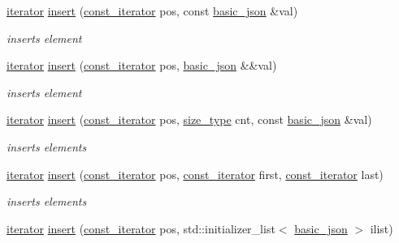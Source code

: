 \begin{DoxyCompactItemize}
\hyperlink{classnlohmann_1_1basic__json_ae3c77a8f03096da2a32a3de0c317d445}{iterator} \hyperlink{classnlohmann_1_1basic__json_a7f7bbb3a9efef2e2442f538a24c1c47b}{insert} (\hyperlink{classnlohmann_1_1basic__json_a2b53a089e945e75deaac6782aa942a77}{const\+\_\+iterator} pos, const \hyperlink{classnlohmann_1_1basic__json}{basic\+\_\+json} \&val)
\begin{DoxyCompactList}\small\item\em inserts element \end{DoxyCompactList}\item 
\hyperlink{classnlohmann_1_1basic__json_ae3c77a8f03096da2a32a3de0c317d445}{iterator} \hyperlink{classnlohmann_1_1basic__json_a8468efcfcd95db15f46887b29924ed5c}{insert} (\hyperlink{classnlohmann_1_1basic__json_a2b53a089e945e75deaac6782aa942a77}{const\+\_\+iterator} pos, \hyperlink{classnlohmann_1_1basic__json}{basic\+\_\+json} \&\&val)
\begin{DoxyCompactList}\small\item\em inserts element \end{DoxyCompactList}\item 
\hyperlink{classnlohmann_1_1basic__json_ae3c77a8f03096da2a32a3de0c317d445}{iterator} \hyperlink{classnlohmann_1_1basic__json_a624025acfcf64364d98424402b837bc6}{insert} (\hyperlink{classnlohmann_1_1basic__json_a2b53a089e945e75deaac6782aa942a77}{const\+\_\+iterator} pos, \hyperlink{classnlohmann_1_1basic__json_a1579a8f72a230358d6cd1a6e8a62859b}{size\+\_\+type} cnt, const \hyperlink{classnlohmann_1_1basic__json}{basic\+\_\+json} \&val)
\begin{DoxyCompactList}\small\item\em inserts elements \end{DoxyCompactList}\item 
\hyperlink{classnlohmann_1_1basic__json_ae3c77a8f03096da2a32a3de0c317d445}{iterator} \hyperlink{classnlohmann_1_1basic__json_aeaa0644fd6b99af364e772092268dfd6}{insert} (\hyperlink{classnlohmann_1_1basic__json_a2b53a089e945e75deaac6782aa942a77}{const\+\_\+iterator} pos, \hyperlink{classnlohmann_1_1basic__json_a2b53a089e945e75deaac6782aa942a77}{const\+\_\+iterator} first, \hyperlink{classnlohmann_1_1basic__json_a2b53a089e945e75deaac6782aa942a77}{const\+\_\+iterator} last)
\begin{DoxyCompactList}\small\item\em inserts elements \end{DoxyCompactList}\item 
\hyperlink{classnlohmann_1_1basic__json_ae3c77a8f03096da2a32a3de0c317d445}{iterator} \hyperlink{classnlohmann_1_1basic__json_aadb4e5be88221e5e28cdb752332f3d13}{insert} (\hyperlink{classnlohmann_1_1basic__json_a2b53a089e945e75deaac6782aa942a77}{const\+\_\+iterator} pos, std\+::initializer\+\_\+list$<$ \hyperlink{classnlohmann_1_1basic__json}{basic\+\_\+json} $>$ ilist)

\end{DoxyCompactItemize}
